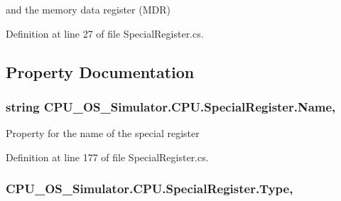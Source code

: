 and the memory data register (M\+D\+R) 

Definition at line 27 of file Special\+Register.\+cs.



\subsection{Property Documentation}
\hypertarget{class_c_p_u___o_s___simulator_1_1_c_p_u_1_1_special_register_ad8ad1efaf680db5471184a74f911b558}{}
\subsubsection[{Name}]{\setlength{\rightskip}{0pt plus 5cm}string C\+P\+U\+\_\+\+O\+S\+\_\+\+Simulator.\+C\+P\+U.\+Special\+Register.\+Name\hspace{0.3cm}{\ttfamily [get]}, {\ttfamily [set]}}\label{class_c_p_u___o_s___simulator_1_1_c_p_u_1_1_special_register_ad8ad1efaf680db5471184a74f911b558}


Property for the name of the special register 



Definition at line 177 of file Special\+Register.\+cs.

\hypertarget{class_c_p_u___o_s___simulator_1_1_c_p_u_1_1_special_register_afd9e45080d792861e577dde31cdb6d3e}{}
\subsubsection[{Type}]{ C\+P\+U\+\_\+\+O\+S\+\_\+\+Simulator.\+C\+P\+U.\+Special\+Register.\+Type\hspace{0.3cm}{\ttfamily [get]}, {\ttfamily [set]}}\label{class_c_p_u___o_s___simulator_1_1_c_p_u_1_1_special_register_afd9e45080d792861e577dde31cdb6d3e}


